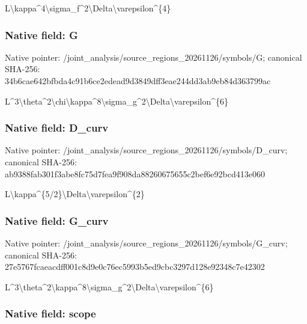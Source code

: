 \documentclass[10pt,a4paper]{article}
\begin{document}
L\textbackslash{}kappa\textasciicircum{}4\textbackslash{}sigma\_f\textasciicircum{}2\textbackslash{}Delt\allowbreak{}a\textbackslash{}varepsilon\textasciicircum{}\{4\}


\subsubsection{Native field: G}


Native pointer: /joint\_analysis/source\_r\allowbreak{}egions\_20261126/symbols/\allowbreak{}G; canonical SHA-256: 34b6cae642bfbda4c91b6ce2\allowbreak{}edead9d3849dff3eae244dd3\allowbreak{}ab9eb84d363799ac


L\textasciicircum{}3\textbackslash{}theta\textasciicircum{}2\textbackslash{}chi\textbackslash{}kappa\textasciicircum{}8\textbackslash{}\allowbreak{}sigma\_g\textasciicircum{}2\textbackslash{}Delta\textbackslash{}varepsil\allowbreak{}on\textasciicircum{}\{6\}


\subsubsection{Native field: D\_curv}


Native pointer: /joint\_analysis/source\_r\allowbreak{}egions\_20261126/symbols/\allowbreak{}D\_curv; canonical SHA-256: ab9388fab301f3abe8fc75d7\allowbreak{}fea9f908da88260675655c2b\allowbreak{}ef6e92bcd413e060


L\textbackslash{}kappa\textasciicircum{}\{5/2\}\textbackslash{}Delta\textbackslash{}varepsilon\textasciicircum{}\{2\}


\subsubsection{Native field: G\_curv}


Native pointer: /joint\_analysis/source\_r\allowbreak{}egions\_20261126/symbols/\allowbreak{}G\_curv; canonical SHA-256: 27e5767fcaeacdff001c8d9e\allowbreak{}0c76ec5993b5ed9cbc3297d1\allowbreak{}28e92348c7e42302


L\textasciicircum{}3\textbackslash{}theta\textasciicircum{}2\textbackslash{}kappa\textasciicircum{}8\textbackslash{}sigm\allowbreak{}a\_g\textasciicircum{}2\textbackslash{}Delta\textbackslash{}varepsilon\textasciicircum{}\{\allowbreak{}6\}


\subsubsection{Native field: scope}
\end{document}
